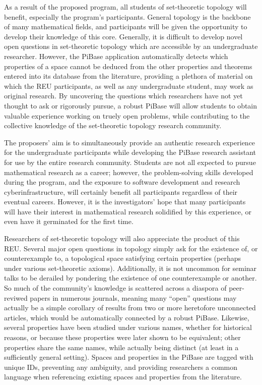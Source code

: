   As a result of the proposed program, all students of set-theoretic topology
  will benefit, especially the program's participants. General topology
  is the backbone of many mathematical fields, and participants will be
  given the opportunity to develop their knowledge of this core.
  Generally, it is difficult to develop novel open questions in set-theoretic
  topology which are accessible by an undergraduate researcher. However,
  the PiBase application automatically detects which properties of
  a space cannot be deduced from the other properties and theorems entered
  into its database from the literature, providing a plethora of material
  on which the REU participants, as well as any undergraduate student, may
  work as original research. By uncovering the questions which researchers
  have not yet thought to ask or rigorously pursue, a robust PiBase
  will allow students to obtain valuable experience working on truely
  open problems, while contributing to the collective knowledge of the
  set-theoretic topology research community.

  The proposers' aim is to simultaneously provide an authentic research
  experience for the undergraduate participants while developing the
  PiBase research assistant for use by the entire research
  community. Students are not all expected to pursue
  mathematical research as a career; however, the problem-solving skills
  developed during the program, and the exposure to software
  development and research cyberinfrastructure, will certainly benefit all
  participants regardless of their eventual careers. However, it is
  the investigators' hope that many participants will have their interest
  in mathematical research solidified by this experience, or even have it
  germinated for the first time.

  Researchers of set-theoretic topology will also appreciate the product
  of this REU. Several major open questions in topology simply ask for
  the existence of, or counterexample to, a topological space satisfying
  certain properties (perhaps under various set-theoretic axioms).
  Additionally, it is not uncommon for seminar talks to be derailed by
  pondering the existence of one counterexample or another. So much
  of the community's knowledge is scattered across
  a diaspora of peer-reviwed papers in numerous journals, meaning many
  ``open'' questions may actually be a simple corollary of results from
  two or more heretofore unconnected articles, which would be automatically
  connected by a robust PiBase. Likewise, several properties have been
  studied under various names, whether for historical reasons, or because
  these properties were later shown to be equivalent; other properties share
  the same names, while actually being distinct (at least in a sufficiently
  general setting). Spaces and properties in the PiBase are tagged with
  unique IDs, preventing any ambiguity, and providing researchers a common
  language when referencing existing spaces and properties from the literature.

